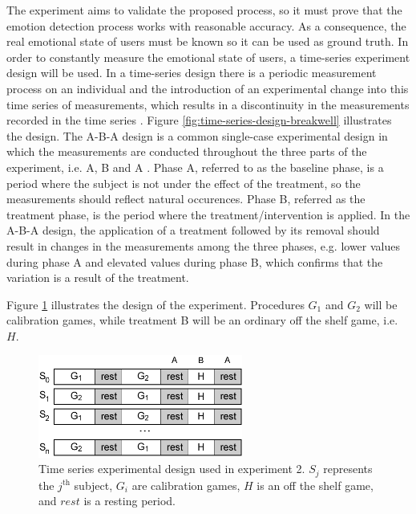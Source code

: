 The experiment aims to validate the proposed process, so it must prove that the emotion detection process works with reasonable accuracy. As a consequence, the real emotional state of users must be known so it can be used as ground truth. In order to constantly measure the emotional state of users, a time-series experiment design will be used. In a time-series design there is a periodic measurement process on an individual and the introduction of an experimental change into this time series of measurements, which results in a discontinuity in the measurements recorded in the time series \parencite{campbell2015experimental}. Figure \ref{fig:time-series-design-breakwell} illustrates the design. The A-B-A design is a common single-case experimental design in which the measurements are conducted throughout the three parts of the experiment, i.e. A, B and A \parencite{robson2016real}. Phase A, referred to as the baseline phase, is a period where the subject is not under the effect of the treatment, so the measurements should reflect natural occurences. Phase B, referred as the treatment phase, is the period where the treatment/intervention is applied. In the A-B-A design, the application of a treatment followed by its removal should result in changes in the measurements among the three phases, e.g. lower values during phase A and elevated values during phase B, which confirms that the variation is a result of the treatment.

Figure \ref{fig:closing-experiment2-design} illustrates the design of the experiment. Procedures $G_1$ and $G_2$ will be calibration games, while treatment B will be an ordinary off the shelf game, i.e. $H$.

\begin{figure}[ht]
    \centering
    \includegraphics[width=0.6\textwidth]{figures/closing-experiment2-design.png}
    \caption{Time series experimental design used in experiment 2. $S_j$ represents the $j^{\text{th}}$ subject, $G_i$ are calibration games, $H$ is an off the shelf game, and $rest$ is a resting period.}
    \label{fig:closing-experiment2-design}
\end{figure}

